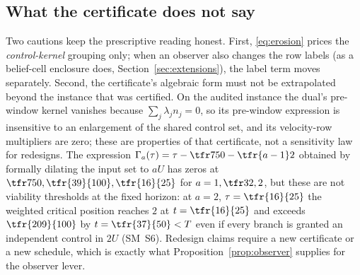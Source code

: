 \subsection{What the certificate does not say}\label{sec:scope-dilation}

Two cautions keep the prescriptive reading honest. First, \eqref{eq:erosion} prices the \emph{control-kernel} grouping only; when an observer also changes the row labels (as a belief-cell enclosure does, Section~\ref{sec:extensions}), the label term moves separately. Second, the certificate's algebraic form must not be extrapolated beyond the instance that was certified. On the audited instance the dual's pre-window kernel vanishes because $\sum_j\lambda_jn_j=0$, so its pre-window expression is insensitive to an enlargement of the shared control set, and its velocity-row multipliers are zero; these are properties of that certificate, not a sensitivity law for redesigns. The expression $\Gamma_a(\tau)=\tau-\tfr7{50}-\tfr{a-1}2$ obtained by formally dilating the input set to $aU$ has zeros at $\tfr7{50},\tfr{39}{100},\tfr{16}{25}$ for $a=1,\tfr32,2$, but these are not viability thresholds at the fixed horizon: at $a=2$, $\tau=\tfr{16}{25}$ the weighted critical position reaches $2$ at $t=\tfr{16}{25}$ and exceeds $\tfr{209}{100}$ by $t=\tfr{37}{50}<T$ even if every branch is granted an independent control in $2U$ (SM~S6). Redesign claims require a new certificate or a new schedule, which is exactly what Proposition~\ref{prop:observer} supplies for the observer lever.
